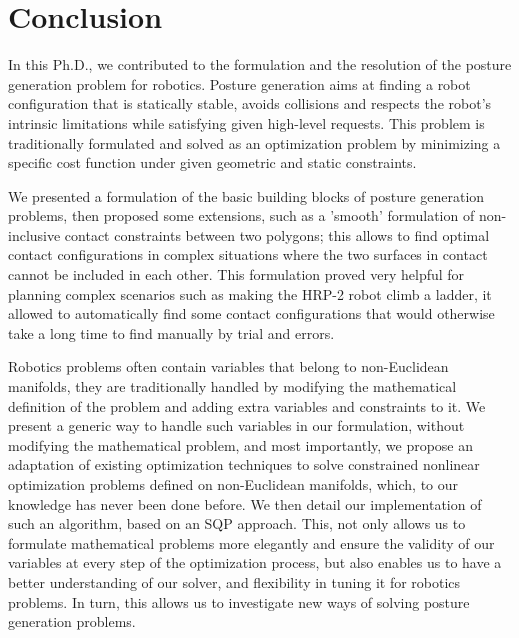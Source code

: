 

\chapter*{Conclusion}
\label{cha:conclusion}

In this Ph.D., we contributed to the formulation and the resolution of the posture generation problem for robotics.
Posture generation aims at finding a robot configuration that is statically stable, avoids collisions and respects the robot's intrinsic limitations while satisfying given high-level requests.
This problem is traditionally formulated and solved as an optimization problem by minimizing a specific cost function under given geometric and static constraints.

We presented a formulation of the basic building blocks of posture generation problems, then proposed some extensions, such as a 'smooth' formulation of non-inclusive contact constraints between two polygons; this allows to find optimal contact configurations in complex situations where the two surfaces in contact cannot be included in each other.
This formulation proved very helpful for planning complex scenarios such as making the HRP-2 robot climb a ladder, it allowed to automatically find some contact configurations that would otherwise take a long time to find manually by trial and errors.

Robotics problems often contain variables that belong to non-Euclidean manifolds, they are traditionally handled by modifying the mathematical definition of the problem and adding extra variables and constraints to it.
We present a generic way to handle such variables in our formulation, without modifying the mathematical problem, and most importantly, we propose an adaptation of existing optimization techniques to solve constrained nonlinear optimization problems defined on non-Euclidean manifolds, which, to our knowledge has never been done before.
We then detail our implementation of such an algorithm, based on an SQP approach.
This, not only allows us to formulate mathematical problems more elegantly and ensure the validity of our variables at every step of the optimization process, but also enables us to have a better understanding of our solver, and flexibility in tuning it for robotics problems.
In turn, this allows us to investigate new ways of solving posture generation problems.

